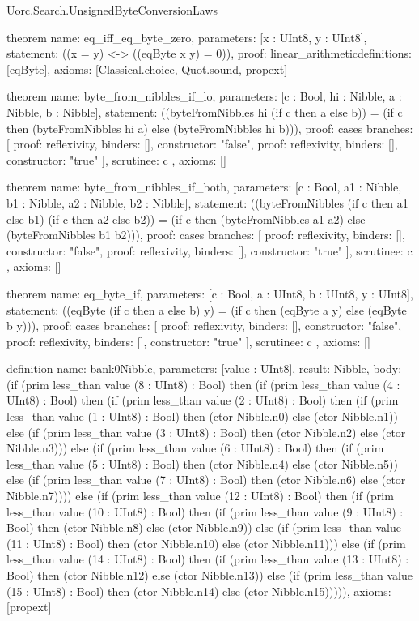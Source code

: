 \begin{lexlean}{Uorc.Search.UnsignedByteConversionLaws}
\begin{semanticmodule}
theorem{
  name: eq_iff_eq_byte_zero,
  parameters: [x : UInt8, y : UInt8],
  statement: ((x = y) <-> ((eqByte x y) = 0)),
  proof: linear_arithmetic{definitions: [eqByte]},
  axioms: [Classical.choice, Quot.sound, propext]
}

theorem{
  name: byte_from_nibbles_if_lo,
  parameters: [c : Bool, hi : Nibble, a : Nibble, b : Nibble],
  statement: ((byteFromNibbles hi (if c then a else b)) = (if c then (byteFromNibbles hi a) else (byteFromNibbles hi b))),
  proof: cases{
    branches: [
      {proof: reflexivity{}, binders: [], constructor: "false"},
      {proof: reflexivity{}, binders: [], constructor: "true"}
    ],
    scrutinee: c
  },
  axioms: []
}

theorem{
  name: byte_from_nibbles_if_both,
  parameters: [c : Bool, a1 : Nibble, b1 : Nibble, a2 : Nibble, b2 : Nibble],
  statement: ((byteFromNibbles (if c then a1 else b1) (if c then a2 else b2)) = (if c then (byteFromNibbles a1 a2) else (byteFromNibbles b1 b2))),
  proof: cases{
    branches: [
      {proof: reflexivity{}, binders: [], constructor: "false"},
      {proof: reflexivity{}, binders: [], constructor: "true"}
    ],
    scrutinee: c
  },
  axioms: []
}

theorem{
  name: eq_byte_if,
  parameters: [c : Bool, a : UInt8, b : UInt8, y : UInt8],
  statement: ((eqByte (if c then a else b) y) = (if c then (eqByte a y) else (eqByte b y))),
  proof: cases{
    branches: [
      {proof: reflexivity{}, binders: [], constructor: "false"},
      {proof: reflexivity{}, binders: [], constructor: "true"}
    ],
    scrutinee: c
  },
  axioms: []
}

definition{
  name: bank0Nibble,
  parameters: [value : UInt8],
  result: Nibble,
  body: (if (prim less_than value (8 : UInt8) : Bool) then (if (prim less_than value (4 : UInt8) : Bool) then (if (prim less_than value (2 : UInt8) : Bool) then (if (prim less_than value (1 : UInt8) : Bool) then (ctor Nibble.n0) else (ctor Nibble.n1)) else (if (prim less_than value (3 : UInt8) : Bool) then (ctor Nibble.n2) else (ctor Nibble.n3))) else (if (prim less_than value (6 : UInt8) : Bool) then (if (prim less_than value (5 : UInt8) : Bool) then (ctor Nibble.n4) else (ctor Nibble.n5)) else (if (prim less_than value (7 : UInt8) : Bool) then (ctor Nibble.n6) else (ctor Nibble.n7)))) else (if (prim less_than value (12 : UInt8) : Bool) then (if (prim less_than value (10 : UInt8) : Bool) then (if (prim less_than value (9 : UInt8) : Bool) then (ctor Nibble.n8) else (ctor Nibble.n9)) else (if (prim less_than value (11 : UInt8) : Bool) then (ctor Nibble.n10) else (ctor Nibble.n11))) else (if (prim less_than value (14 : UInt8) : Bool) then (if (prim less_than value (13 : UInt8) : Bool) then (ctor Nibble.n12) else (ctor Nibble.n13)) else (if (prim less_than value (15 : UInt8) : Bool) then (ctor Nibble.n14) else (ctor Nibble.n15))))),
  axioms: [propext]
}


\end{semanticmodule}
\end{lexlean}
